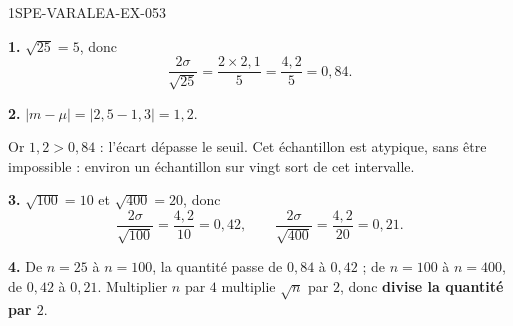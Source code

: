 \begin{corrige}{1SPE-VARALEA-EX-053}

\textbf{1.} $\sqrt{25} = 5$, donc
\[
\frac{2\sigma}{\sqrt{25}} = \frac{2 \times 2{,}1}{5} = \frac{4{,}2}{5} = 0{,}84.
\]

\medskip
\textbf{2.} $|m - \mu| = |2{,}5 - 1{,}3| = 1{,}2$.

Or $1{,}2 > 0{,}84$ : l'écart dépasse le seuil. Cet échantillon est atypique,
sans être impossible : environ un échantillon sur vingt sort de cet intervalle.

\medskip
\textbf{3.} $\sqrt{100} = 10$ et $\sqrt{400} = 20$, donc
\[
\frac{2\sigma}{\sqrt{100}} = \frac{4{,}2}{10} = 0{,}42,
\qquad
\frac{2\sigma}{\sqrt{400}} = \frac{4{,}2}{20} = 0{,}21.
\]

\medskip
\textbf{4.} De $n = 25$ à $n = 100$, la quantité passe de $0{,}84$ à $0{,}42$ ;
de $n = 100$ à $n = 400$, de $0{,}42$ à $0{,}21$. Multiplier $n$ par $4$
multiplie $\sqrt{n}$ par $2$, donc \textbf{divise la quantité par $2$}.

\end{corrige}

